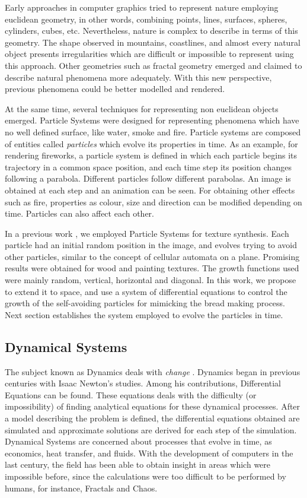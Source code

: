 \documentclass[oneside,a4paper,english,links]{amca}
\begin{document}
Early approaches in computer graphics tried to represent nature employing euclidean geometry, in other words, combining points, lines, surfaces, spheres, cylinders, cubes, etc. Nevertheless, nature is complex to describe in terms of this geometry. The shape observed in mountains, coastlines,  and almost every natural object presents irregularities which are difficult or impossible to represent using this approach. Other geometries such as fractal geometry \citep{Mandelbrot83} emerged and claimed to describe natural phenomena more adequately. With this new perspective, previous phenomena could be better modelled and rendered. 

At the same time, several techniques for representing non euclidean objects emerged. Particle Systems \citep{Reeves83} were designed for representing phenomena which have no well defined surface, like water, smoke and fire. Particle systems are composed of entities called {\em particles} which evolve its properties in time. As an example, for rendering fireworks, a particle system is defined in which each particle begins its trajectory in a common space position, and each time step its position changes following a parabola. Different particles follow different parabolas. An image is obtained at each step and an animation can be seen. For obtaining other effects such as fire, properties as colour, size and direction can be modified depending on time. Particles can also affect each other.

In a previous work \citep{Baravalle2011}, we employed Particle Systems for texture synthesis. Each particle had an initial random position in the image, and evolves trying to avoid other particles, similar to the concept of cellular automata on a plane. Promising results were obtained for wood and painting textures. The growth functions used were mainly random, vertical, horizontal and diagonal. In this work, we propose to extend it to space, and use a system of differential equations to control the growth of the self-avoiding particles for mimicking the bread making process. Next section establishes the system employed to evolve the particles in time.

\subsection{Dynamical Systems}

The subject known as Dynamics deals with {\em change} \citep{Strogatz2001}. Dynamics began in previous centuries with Isaac Newton's studies. Among his contributions, Differential Equations can be found. These equations deals with the difficulty (or impossibility) of finding analytical equations for these dynamical processes. After a model describing the problem is defined, the differential equations obtained are simulated and approximate solutions are derived for each step of the simulation. Dynamical Systems are concerned about processes that evolve in time, as economics, heat transfer, and fluids. With the development of computers in the last century, the field has been able to obtain insight in areas which were impossible before, since the calculations were too difficult to be performed by humans, for instance, Fractals \citep{Mandelbrot83} and Chaos.
\end{document}
